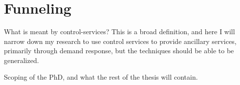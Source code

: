 
\section{Funneling} %
\label{sec:Funneling}
What is meant by control-services? This is a broad definition, and here I will  narrow down my research to use control services to provide ancillary services, primarily through demand response, but the techniques should be able to be generalized.

Scoping of the PhD, and what the rest of the thesis will contain.


